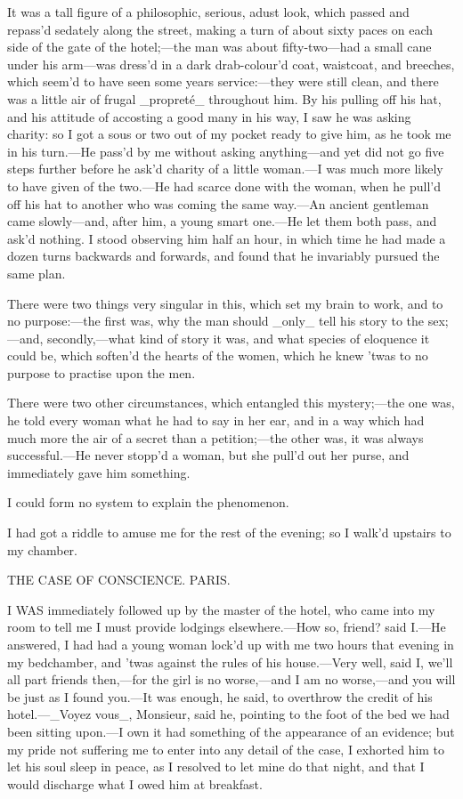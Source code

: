 \documentclass[twoside]{article}
\begin{document}
It was a tall figure of a philosophic, serious, adust look, which passed
and repass’d sedately along the street, making a turn of about sixty
paces on each side of the gate of the hotel;—the man was about
fifty-two—had a small cane under his arm—was dress’d in a dark
drab-colour’d coat, waistcoat, and breeches, which seem’d to have seen
some years service:—they were still clean, and there was a little air of
frugal _propreté_ throughout him.  By his pulling off his hat, and his
attitude of accosting a good many in his way, I saw he was asking
charity: so I got a sous or two out of my pocket ready to give him, as he
took me in his turn.—He pass’d by me without asking anything—and yet did
not go five steps further before he ask’d charity of a little woman.—I
was much more likely to have given of the two.—He had scarce done with
the woman, when he pull’d off his hat to another who was coming the same
way.—An ancient gentleman came slowly—and, after him, a young smart
one.—He let them both pass, and ask’d nothing.  I stood observing him
half an hour, in which time he had made a dozen turns backwards and
forwards, and found that he invariably pursued the same plan.

There were two things very singular in this, which set my brain to work,
and to no purpose:—the first was, why the man should _only_ tell his
story to the sex;—and, secondly,—what kind of story it was, and what
species of eloquence it could be, which soften’d the hearts of the women,
which he knew ’twas to no purpose to practise upon the men.

There were two other circumstances, which entangled this mystery;—the one
was, he told every woman what he had to say in her ear, and in a way
which had much more the air of a secret than a petition;—the other was,
it was always successful.—He never stopp’d a woman, but she pull’d out
her purse, and immediately gave him something.

I could form no system to explain the phenomenon.

I had got a riddle to amuse me for the rest of the evening; so I walk’d
upstairs to my chamber.




THE CASE OF CONSCIENCE.
PARIS.


I WAS immediately followed up by the master of the hotel, who came into
my room to tell me I must provide lodgings elsewhere.—How so, friend?
said I.—He answered, I had had a young woman lock’d up with me two hours
that evening in my bedchamber, and ’twas against the rules of his
house.—Very well, said I, we’ll all part friends then,—for the girl is no
worse,—and I am no worse,—and you will be just as I found you.—It was
enough, he said, to overthrow the credit of his hotel.—_Voyez vous_,
Monsieur, said he, pointing to the foot of the bed we had been sitting
upon.—I own it had something of the appearance of an evidence; but my
pride not suffering me to enter into any detail of the case, I exhorted
him to let his soul sleep in peace, as I resolved to let mine do that
night, and that I would discharge what I owed him at breakfast.
\end{document}
